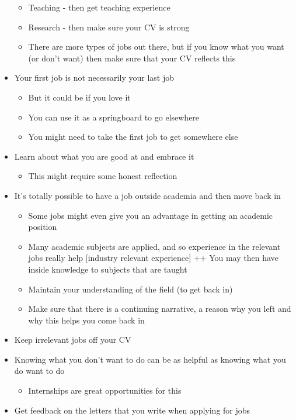 \documentclass[
]{krantz}
\providecommand{\tightlist}{%
  \setlength{\itemsep}{0pt}\setlength{\parskip}{0pt}}
\begin{document}
\begin{itemize}
  \begin{itemize}
  \tightlist
  \item
    Teaching - then get teaching experience
  \item
    Research - then make sure your CV is strong
  \item
    There are more types of jobs out there, but if you know what you want (or don't want) then make sure that your CV reflects this
  \end{itemize}
\item
  Your first job is not necessarily your last job

  \begin{itemize}
  \tightlist
  \item
    But it could be if you love it
  \item
    You can use it as a springboard to go elsewhere
  \item
    You might need to take the first job to get somewhere else
  \end{itemize}
\item
  Learn about what you are good at and embrace it

  \begin{itemize}
  \tightlist
  \item
    This might require some honest reflection
  \end{itemize}
\item
  It's totally possible to have a job outside academia and then move back in

  \begin{itemize}
  \tightlist
  \item
    Some jobs might even give you an advantage in getting an academic position
  \item
    Many academic subjects are applied, and so experience in the relevant jobs really help {[}industry relevant experience{]}
    ++ You may then have inside knowledge to subjects that are taught
  \item
    Maintain your understanding of the field (to get back in)
  \item
    Make sure that there is a continuing narrative, a reason why you left and why this helps you come back in
  \end{itemize}
\item
  Keep irrelevant jobs off your CV
\item
  Knowing what you don't want to do can be as helpful as knowing what you do want to do

  \begin{itemize}
  \tightlist
  \item
    Internships are great opportunities for this
  \end{itemize}
\item
  Get feedback on the letters that you write when applying for jobs


\end{itemize}
\end{document}
